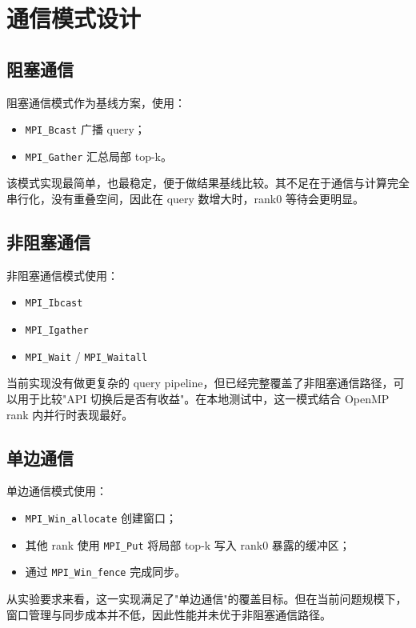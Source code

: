 \documentclass[a4paper]{article}
\begin{document}
\section{通信模式设计}

\subsection{阻塞通信}

阻塞通信模式作为基线方案，使用：
\begin{itemize}
    \item \texttt{MPI\_Bcast} 广播 query；
    \item \texttt{MPI\_Gather} 汇总局部 top-k。
\end{itemize}

该模式实现最简单，也最稳定，便于做结果基线比较。其不足在于通信与计算完全串行化，没有重叠空间，因此在 query 数增大时，rank0 等待会更明显。

\subsection{非阻塞通信}

非阻塞通信模式使用：
\begin{itemize}
    \item \texttt{MPI\_Ibcast}
    \item \texttt{MPI\_Igather}
    \item \texttt{MPI\_Wait} / \texttt{MPI\_Waitall}
\end{itemize}

当前实现没有做更复杂的 query pipeline，但已经完整覆盖了非阻塞通信路径，可以用于比较"API 切换后是否有收益"。在本地测试中，这一模式结合 OpenMP rank 内并行时表现最好。

\subsection{单边通信}

单边通信模式使用：
\begin{itemize}
    \item \texttt{MPI\_Win\_allocate} 创建窗口；
    \item 其他 rank 使用 \texttt{MPI\_Put} 将局部 top-k 写入 rank0 暴露的缓冲区；
    \item 通过 \texttt{MPI\_Win\_fence} 完成同步。
\end{itemize}

从实验要求来看，这一实现满足了"单边通信"的覆盖目标。但在当前问题规模下，窗口管理与同步成本并不低，因此性能并未优于非阻塞通信路径。
\end{document}
